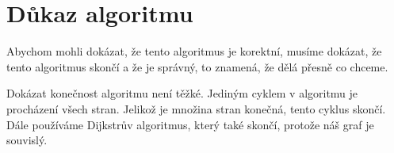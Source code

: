 \section{Důkaz algoritmu}
\label{dukaz_algoritmu}

Abychom mohli dokázat, že tento algoritmus je korektní, musíme dokázat, že tento algoritmus skončí a že je správný, to znamená, že dělá přesně co chceme.

Dokázat konečnost algoritmu není těžké. Jediným cyklem v algoritmu je procházení všech stran. Jelikož je množina stran konečná, tento cyklus skončí.  Dále používáme Dijkstrův algoritmus, který také skončí, protože náš graf je souvislý. 